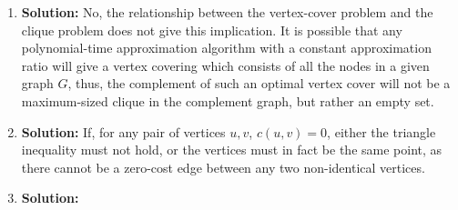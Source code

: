\documentclass{article}
\begin{document}
\begin{enumerate}
    \item \textbf{Solution:}
    No, the relationship between the vertex-cover problem and the clique problem
    does not give this implication. It is possible that any polynomial-time
    approximation algorithm with a constant approximation ratio will give a
    vertex covering which consists of all the nodes in a given graph $G$, thus,
    the complement of such an optimal vertex cover will not be a maximum-sized
    clique in the complement graph, but rather an empty set.

    \item \textbf{Solution:}
    If, for any pair of vertices $u, v$, $c(u,v) = 0$, either the triangle
    inequality must not hold, or the vertices must in fact be the same point, as
    there cannot be a zero-cost edge between any two non-identical vertices.

    \item \textbf{Solution:}
\end{enumerate}
\end{document}
